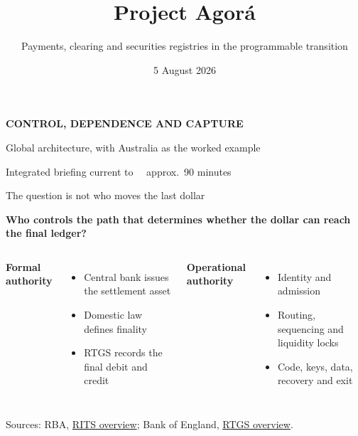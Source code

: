 \documentclass[aspectratio=169,12pt]{beamer}
\title{Project Agor\'a}
\subtitle{Payments, clearing and securities registries in the programmable transition}
\date{5 August 2026}
\newcommand{\rust}[1]{\textcolor{Rust}{\textbf{#1}}}
\newcommand{\blue}[1]{\textcolor{Ocean}{\textbf{#1}}}
\newcommand{\claim}[1]{\begin{center}\fontsize{16}{19}\selectfont\bfseries #1\end{center}}
\newcommand{\source}[1]{\vfill\par\fontsize{5.4}{6.5}\selectfont\color{Quiet}Sources: #1}
\newcommand{\tightitems}{\setlength{\itemsep}{0.42em}\setlength{\parskip}{0pt}}
\begin{document}
\begingroup
{}
\begin{frame}[plain]
  \vspace{0.62cm}
  {\color{Gold}\fontsize{10}{12}\selectfont\bfseries CONTROL, DEPENDENCE AND CAPTURE\par}
  \vspace{0.28cm}
  {\color{White}\inserttitle\par}
  \vspace{0.32cm}
  {\color{Mist}\insertsubtitle\par}
  \vfill
  {\color{White}\fontsize{9.6}{11.5}\selectfont Global architecture, with Australia as the worked example\par}
  \vspace{0.12cm}
  {\color{Mist}\fontsize{7.8}{9.5}\selectfont Integrated briefing current to \insertdate\ \textperiodcentered\ approx.\ 90 minutes}
\end{frame}
\endgroup

\begin{frame}{The question is not who moves the last dollar}
  \claim{Who controls the path that determines whether the dollar can reach the final ledger?}
  \vspace{0.22cm}
  \begin{columns}[T,onlytextwidth]
      \rust{Formal authority}
      \begin{itemize}\tightitems
        \item Central bank issues the settlement asset
        \item Domestic law defines finality
        \item RTGS records the final debit and credit
      \end{itemize}
      \blue{Operational authority}
      \begin{itemize}\tightitems
        \item Identity and admission
        \item Routing, sequencing and liquidity locks
        \item Code, keys, data, recovery and exit
      \end{itemize}
  \end{columns}
  \source{RBA, \href{https://www.rba.gov.au/payments-and-infrastructure/rits/about.html}{RITS overview}; Bank of England, \href{https://www.bankofengland.co.uk/payment-and-settlement/a-brief-introduction-to-the-real-time-gross-settlement-system-and-chaps}{RTGS overview}.}
\end{frame}
\end{document}
